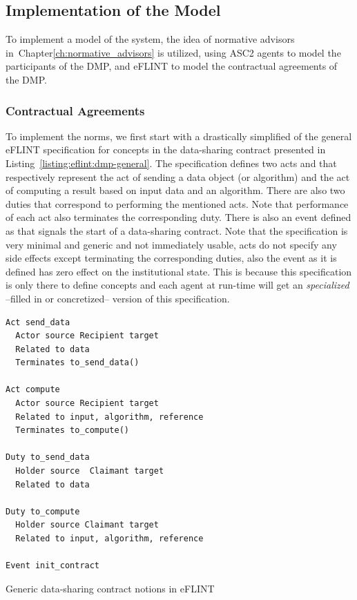 \subsection{Implementation of the Model}
To implement a model of the system, the idea of normative advisors in~Chapter\ref{ch:normative_advisors} is utilized, using ASC2 agents to model the participants of the DMP, and eFLINT to model the contractual agreements of the DMP. 

\subsubsection{Contractual Agreements}
To implement the norms, we first start with a drastically simplified of the general eFLINT specification for concepts in the data-sharing contract presented in Listing~\ref{listing:eflint:dmp-general}. The specification defines two acts  and  that respectively represent the act of sending a data object (or algorithm) and the act of computing a result based on input data and an algorithm. There are also two duties that correspond to performing the mentioned acts. Note that performance of each act also terminates the corresponding duty. There is also an event defined as  that signals the start of a data-sharing contract. Note that the specification is very minimal and generic and not immediately usable, acts do not specify any side effects except terminating the corresponding duties, also the  event as it is defined has zero effect on the institutional state. This is because this specification is only there to define concepts and each agent at run-time will get an \textit{specialized} --filled in or concretized-- version of this specification.

\begin{listing}[t]
\centering
\begin{tcolorbox}[left=2pt,right=2pt,top=2pt,bottom=2pt]
\begin{verbatim}
Act send_data
  Actor source Recipient target
  Related to data 
  Terminates to_send_data()

Act compute
  Actor source Recipient target
  Related to input, algorithm, reference
  Terminates to_compute()

Duty to_send_data
  Holder source  Claimant target 
  Related to data

Duty to_compute
  Holder source Claimant target
  Related to input, algorithm, reference

Event init_contract
\end{verbatim}
\end{tcolorbox}
\caption{Generic data-sharing contract notions in eFLINT}
\label{listing:eflint:dmp-general}
\end{listing}

